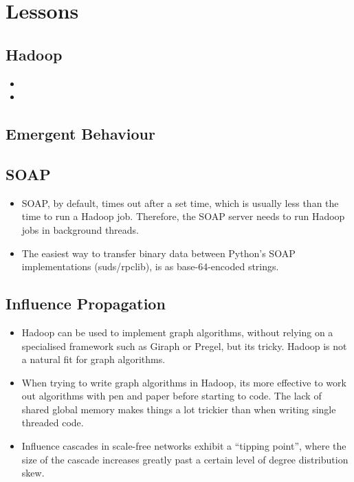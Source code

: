 \section{Lessons}


\subsection{Hadoop}

\begin{itemize}
  \item 
  \item 
\end{itemize}

\subsection{Emergent Behaviour}

\subsection{SOAP}

\begin{itemize}
  \item SOAP, by default, times out after a set time, which is usually less than the time to run a Hadoop job. Therefore, the SOAP server needs to run Hadoop jobs in background threads.
  \item The easiest way to transfer binary data between Python's SOAP implementations (suds/rpclib), is as base-64-encoded strings.
\end{itemize}

\subsection{Influence Propagation}

\begin{itemize}
	\item Hadoop can be used to implement graph algorithms, without relying on a specialised framework such as Giraph or Pregel, but its tricky. Hadoop is not a natural fit for graph algorithms.
	\item When trying to write graph algorithms in Hadoop, its more effective to work out algorithms with pen and paper before starting to code. The lack of shared global memory makes things a lot trickier than when writing single threaded code.
        \item Influence cascades in scale-free networks exhibit a ``tipping point'', where the size of the cascade increases greatly past a certain level of degree distribution skew.
\end{itemize}


